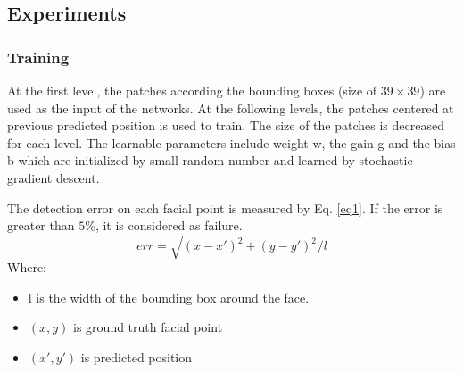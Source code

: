 \subsection{Experiments}
\subsubsection{Training}
At the first level, the patches according the bounding boxes (size of $39 \times 39$) are used as the input of the networks. At the following levels, the patches centered at previous predicted position is used to train. The size of the patches is decreased for each level. The learnable parameters include weight w, the gain g and the bias b which are initialized by small random number and learned by stochastic gradient descent.

The detection error on each facial point is measured by Eq. \ref{eq1}. If the error is greater than $5\%$, it is considered as failure.
\begin{equation}
	err = \sqrt{(x-x')^2 + (y-y')^2}/l
	\label{eq1}
\end{equation}
Where:
\begin{itemize}
	\item l is the width of the bounding box around the face.
	\item $(x,y)$ is ground truth facial point
	\item $(x',y')$ is predicted position
\end{itemize}
